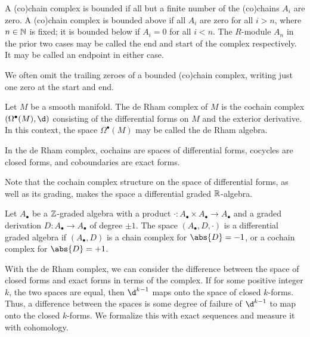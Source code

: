\documentclass[a4paper,12pt]{article}
\begin{document}
\begin{definition}\label{def:bounded_(co)chain_complex}
    A (co)chain complex is bounded if all but a finite number of the (co)chains $A_i$ are zero.
    A (co)chain complex is bounded above if all $A_i$ are zero for all $i > n$, where $n \in \mathbb{N}$ is fixed; it is bounded below if $A_i = 0$ for all $i < n$.
    The $R$-module $A_n$ in the prior two cases may be called the end and start of the complex respectively.
    It may be called an endpoint in either case.
\end{definition}
\begin{remark}
    We often omit the trailing zeroes of a bounded (co)chain complex, writing just one zero at the start and end.
\end{remark}
\begin{definition}\label{def:de_rham_complex}
    Let $M$ be a smooth manifold.
    The de Rham complex of $M$ is the cochain complex $(\Omega^\bullet(M), \d)$ consisting of the differential forms on $M$ and the exterior derivative.
    In this context, the space $\Omega^\bullet(M)$ may be called the de Rham algebra.
\end{definition}
\begin{remark}
    In the de Rham complex, cochains are spaces of differential forms, cocycles are closed forms, and coboundaries are exact forms.
\end{remark}
Note that the cochain complex structure on the space of differential forms, as well as its grading, makes the space a differential graded $\mathbb{R}$-algebra.
\begin{definition}\label{def:differential_graded_algebra}
    Let $A_\bullet$ be a $\mathbb{Z}$-graded algebra with a product $\cdot \colon A_\bullet \times A_\bullet \to A_\bullet$ and a graded derivation $D \colon A_\bullet \to A_\bullet$ of degree $\pm 1$.
    The space $(A_\bullet, D, \cdot)$ is a differential graded algebra if $(A_\bullet, D)$ is a chain complex for $\abs{D} = -1$, or a cochain complex for $\abs{D} = +1$.
\end{definition}
With the de Rham complex, we can consider the difference between the space of closed forms and exact forms in terms of the complex.
If for some positive integer $k$, the two spaces are equal, then $\d^{k-1}$ maps onto the space of closed $k$-forms.
Thus, a difference between the spaces is some degree of failure of $\d^{k-1}$ to map onto the closed $k$-forms.
We formalize this with exact sequences and measure it with cohomology.
\end{document}
